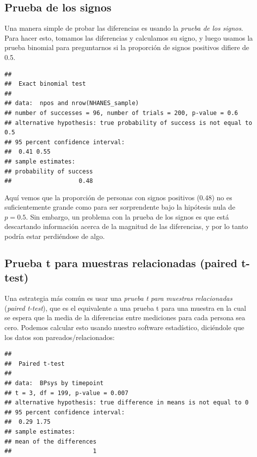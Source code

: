 \documentclass[
  12pt,
]{book}
\begin{document}
\hypertarget{prueba-de-los-signos}{%
\subsection{Prueba de los signos}\label{prueba-de-los-signos}}

Una manera simple de probar las diferencias es usando la \emph{prueba de los signos}. Para hacer esto, tomamos las diferencias y calculamos su signo, y luego usamos la prueba binomial para preguntarnos si la proporción de signos positivos difiere de 0.5.

\begin{verbatim}
## 
## 	Exact binomial test
## 
## data:  npos and nrow(NHANES_sample)
## number of successes = 96, number of trials = 200, p-value = 0.6
## alternative hypothesis: true probability of success is not equal to 0.5
## 95 percent confidence interval:
##  0.41 0.55
## sample estimates:
## probability of success 
##                   0.48
\end{verbatim}

Aquí vemos que la proporción de personas con signos positivos (0.48) no es suficientemente grande como para ser sorprendente bajo la hipótesis nula de \(p=0.5\). Sin embargo, un problema con la prueba de los signos es que está descartando información acerca de la magnitud de las diferencias, y por lo tanto podría estar perdiéndose de algo.

\hypertarget{prueba-t-para-muestras-relacionadas-paired-t-test}{%
\subsection{Prueba t para muestras relacionadas (paired t-test)}\label{prueba-t-para-muestras-relacionadas-paired-t-test}}

Una estrategia más común es usar una \emph{prueba t para muestras relacionadas} (\emph{paired t-test}), que es el equivalente a una prueba t para una muestra en la cual se espera que la media de la diferencias entre mediciones para cada persona sea cero. Podemos calcular esto usando nuestro software estadístico, diciéndole que los datos son pareados/relacionados:

\begin{verbatim}
## 
## 	Paired t-test
## 
## data:  BPsys by timepoint
## t = 3, df = 199, p-value = 0.007
## alternative hypothesis: true difference in means is not equal to 0
## 95 percent confidence interval:
##  0.29 1.75
## sample estimates:
## mean of the differences 
##                       1
\end{verbatim}
\end{document}

